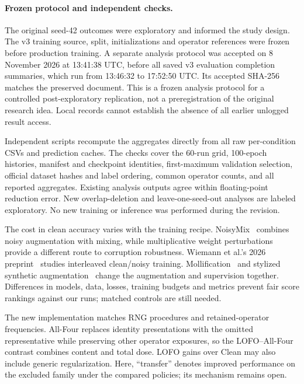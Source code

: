 \documentclass[twoside,a4paper,11pt]{article}
\begin{document}
\paragraph{Frozen protocol and independent checks.}
\label{supp:protocolrecord}
The original seed-42 outcomes were exploratory and informed the study design. The v3 training source, split, initializations and operator references were frozen before production training. A separate analysis protocol was accepted on 8 November 2026 at 13:41:38 UTC, before all saved v3 evaluation completion summaries, which run from 13:46:32 to 17:52:50 UTC. Its accepted SHA-256 matches the preserved document. This is a frozen analysis protocol for a controlled post-exploratory replication, not a preregistration of the original research idea. Local records cannot establish the absence of all earlier unlogged result access.

Independent scripts recompute the aggregates directly from all raw per-condition CSVs and prediction caches. The checks cover the 60-run grid, 100-epoch histories, manifest and checkpoint identities, first-maximum validation selection, official dataset hashes and label ordering, common operator counts, and all reported aggregates. Existing analysis outputs agree within floating-point reduction error. New overlap-deletion and leave-one-seed-out analyses are labeled exploratory. No new training or inference was performed during the revision.


The cost in clean accuracy varies with the training recipe. NoisyMix~\cite{erichson2024noisymix} combines noisy augmentation with mixing, while multiplicative weight perturbations~\cite{trinh2024damp} provide a different route to corruption robustness. Wiemann et al.'s 2026 preprint~\cite{wiemann2026interleaved} studies interleaved clean/noisy training. Mollification~\cite{heinonen2025mollification} and stylized synthetic augmentation~\cite{siedel2026stylized} change the augmentation and supervision together. Differences in models, data, losses, training budgets and metrics prevent fair score rankings against our runs; matched controls are still needed.


The new implementation matches RNG procedures and retained-operator frequencies. All-Four replaces identity presentations with the omitted representative while preserving other operator exposures, so the LOFO--All-Four contrast combines content and total dose. LOFO gains over Clean may also include generic regularization. Here, ``transfer'' denotes improved performance on the excluded family under the compared policies; its mechanism remains open.
\end{document}
